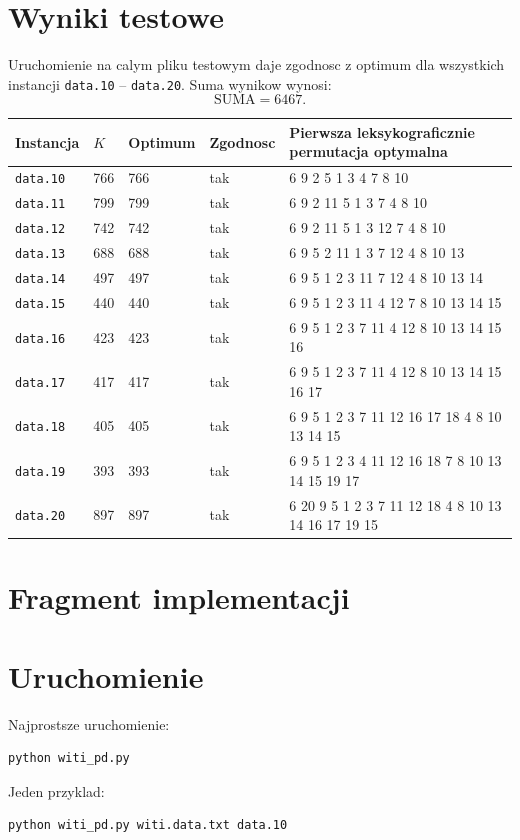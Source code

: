 \documentclass[a4paper,12pt]{article}
\begin{document}
\section{Wyniki testowe}
Uruchomienie na calym pliku testowym daje zgodnosc z optimum dla wszystkich instancji \texttt{data.10} -- \texttt{data.20}.
Suma wynikow wynosi:
\[
\text{SUMA} = 6467.
\]

\begin{longtable}{@{}llllp{7.4cm}@{}}
\toprule
Instancja & $K$ & Optimum & Zgodnosc & Pierwsza leksykograficznie permutacja optymalna \\
\midrule
\endhead
\texttt{data.10} & 766 & 766 & tak & 6 9 2 5 1 3 4 7 8 10 \\
\texttt{data.11} & 799 & 799 & tak & 6 9 2 11 5 1 3 7 4 8 10 \\
\texttt{data.12} & 742 & 742 & tak & 6 9 2 11 5 1 3 12 7 4 8 10 \\
\texttt{data.13} & 688 & 688 & tak & 6 9 5 2 11 1 3 7 12 4 8 10 13 \\
\texttt{data.14} & 497 & 497 & tak & 6 9 5 1 2 3 11 7 12 4 8 10 13 14 \\
\texttt{data.15} & 440 & 440 & tak & 6 9 5 1 2 3 11 4 12 7 8 10 13 14 15 \\
\texttt{data.16} & 423 & 423 & tak & 6 9 5 1 2 3 7 11 4 12 8 10 13 14 15 16 \\
\texttt{data.17} & 417 & 417 & tak & 6 9 5 1 2 3 7 11 4 12 8 10 13 14 15 16 17 \\
\texttt{data.18} & 405 & 405 & tak & 6 9 5 1 2 3 7 11 12 16 17 18 4 8 10 13 14 15 \\
\texttt{data.19} & 393 & 393 & tak & 6 9 5 1 2 3 4 11 12 16 18 7 8 10 13 14 15 19 17 \\
\texttt{data.20} & 897 & 897 & tak & 6 20 9 5 1 2 3 7 11 12 18 4 8 10 13 14 16 17 19 15 \\
\bottomrule
\end{longtable}

\section{Fragment implementacji}


\section{Uruchomienie}
Najprostsze uruchomienie:
\begin{lstlisting}
python witi_pd.py
\end{lstlisting}
Jeden przyklad:
\begin{lstlisting}
python witi_pd.py witi.data.txt data.10
\end{lstlisting}
\end{document}
